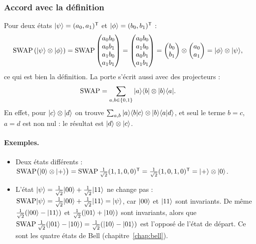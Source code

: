 \subsubsection{Accord avec la définition}

Pour deux états $|\psi\rangle=(a_0,a_1)^{\mathsf T}$ et $|\phi\rangle=(b_0,b_1)^{\mathsf T}$ :
\[
  \mathrm{SWAP}\,(|\psi\rangle\otimes|\phi\rangle)
  =\mathrm{SWAP}\begin{pmatrix}a_0b_0\\a_0b_1\\a_1b_0\\a_1b_1\end{pmatrix}
  =\begin{pmatrix}a_0b_0\\a_1b_0\\a_0b_1\\a_1b_1\end{pmatrix}
  =\begin{pmatrix}b_0\\b_1\end{pmatrix}\otimes\begin{pmatrix}a_0\\a_1\end{pmatrix}
  =|\phi\rangle\otimes|\psi\rangle,
\]
ce qui est bien la définition. La porte s'écrit aussi avec des projecteurs :
\[
  \mathrm{SWAP}=\sum_{a,b\in\{0,1\}}|a\rangle\langle b|\otimes|b\rangle\langle a|.
\]
En effet, pour $|c\rangle\otimes|d\rangle$ on trouve
$\sum_{a,b}|a\rangle\langle b|c\rangle\otimes|b\rangle\langle a|d\rangle$, et seul le terme $b=c$, $a=d$
est non nul : le résultat est $|d\rangle\otimes|c\rangle$.

\paragraph{Exemples.}
\begin{itemize}[nosep]
  \item Deux états différents : $\mathrm{SWAP}\big(|0\rangle\otimes|+\rangle\big)
        =\mathrm{SWAP}\,\frac{1}{\sqrt2}(1,1,0,0)^{\mathsf T}=\frac{1}{\sqrt2}(1,0,1,0)^{\mathsf T}
        =|+\rangle\otimes|0\rangle$.
  \item L'état $|\psi\rangle=\frac{1}{\sqrt2}|00\rangle+\frac{1}{\sqrt2}|11\rangle$ ne change pas :
        $\mathrm{SWAP}|\psi\rangle=\frac{1}{\sqrt2}|00\rangle+\frac{1}{\sqrt2}|11\rangle=|\psi\rangle$,
        car $|00\rangle$ et $|11\rangle$ sont invariants. De même
        $\frac{1}{\sqrt2}(|00\rangle-|11\rangle)$ et $\frac{1}{\sqrt2}(|01\rangle+|10\rangle)$ sont invariants,
        alors que $\mathrm{SWAP}\,\frac{1}{\sqrt2}(|01\rangle-|10\rangle)=\frac{1}{\sqrt2}(|10\rangle-|01\rangle)$
        est l'opposé de l'état de départ. Ce sont les quatre états de Bell (chapitre~\ref{chap:bell}).
\end{itemize}

